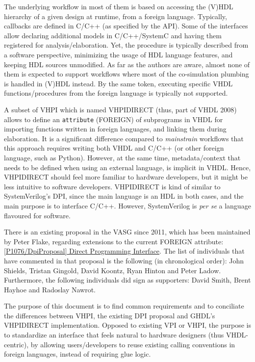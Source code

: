 \documentclass[
]{article}
\begin{document}
The underlying workflow in most of them is based on accessing the (V)HDL hierarchy of a given design at runtime, from a foreign language. Typically, callbacks are defined in C/C++ (as specified by the API). Some of the interfaces allow declaring additional models in C/C++/SystemC and having them registered for analysis/elaboration. Yet, the procedure is typically described from a software perspective, minimizing the usage of HDL language features, and keeping HDL sources unmodified. As far as the authors are aware, almost none of them is expected to support workflows where most of the co-simulation plumbing is handled in (V)HDL instead. By the same token, executing specific VHDL functions/procedures from the foreign language is typically not supported.

A subset of VHPI which is named VHPIDIRECT (thus, part of VHDL 2008) allows to define an \texttt{attribute} (FOREIGN) of subprograms in VHDL for importing functions written in foreign languages, and linking them during elaboration. It is a significant difference compared to \emph{mainstrain} workflows that this approach requires writing both VHDL and C/C++ (or other foreign language, such as Python). However, at the same time, metadata/context that needs to be defined when using an external language, is implicit in VHDL. Hence, VHPIDIRECT should feel more familiar to hardware developers, but it might be less intuitive to software developers. VHPIDIRECT is kind of similar to SystemVerilog's DPI, since the main language is an HDL in both cases, and the main purpose is to interface C/C++. However, SystemVerilog is \emph{per se} a language flavoured for software.

There is an existing proposal in the VASG since 2011, which has been maintained by Peter Flake, regarding extensions to the current FOREIGN attribute: \href{http://www.eda-twiki.org/cgi-bin/view.cgi/P1076/DpiProposal}{{[}P1076/DpiProposal{]} Direct Programming Interface}. The list of individuals that have commented in that proposal is the following (in chronological order): John Shields, Tristan Gingold, David Koontz, Ryan Hinton and Peter Ladow. Furthermore, the following individuals did sign as supporters: David Smith, Brent Hayhoe and Radoslay Nawrot.

The purpose of this document is to find common requirements and to conciliate the differences between VHPI, the existing DPI proposal and GHDL's VHPIDIRECT implementation. Opposed to existing VPI or VHPI, the purpose is to standardize an interface that feels natural to hardware designers (thus VHDL-centric), by allowing users/developers to reuse existing calling conventions in foreign languages, instead of requiring glue logic.
\end{document}
